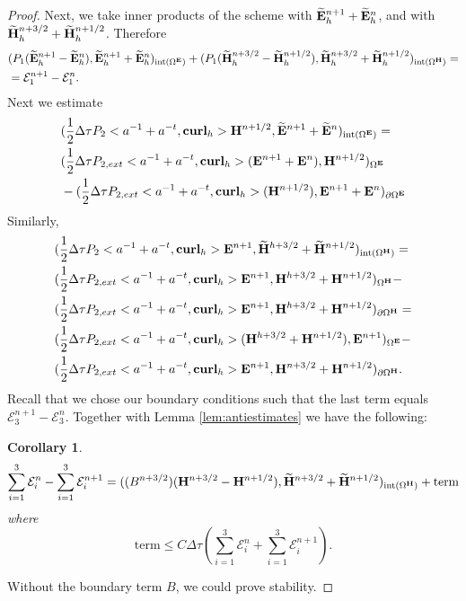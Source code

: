 \documentclass[12pt,reqno]{amsart}
\newcommand{\curl}{{\bf curl}}
\newcommand{\e}{{\bf E}}
\newcommand{\h}{{\bf H}}
\newtheorem{cor}[theorem]{Corollary}
\theoremstyle{definition}
\numberwithin{equation}{section}
\newcommand{\intr}[1]{\mathrm{int}(#1)}
\def\Gw{\Omega}     \def\Gx{\Xi}         \def\Gy{\Psi}
\begin{document}
\begin{proof}
	Next, we take inner products of the scheme with $\widetilde{\e}_h^{n+1}+\widetilde{\e}_h^n$,
	and with 
	$\widetilde{\h}_h^{n+3/2}+\widetilde{\h}_h^{n+1/2}$. Therefore
\begin{align*}
	&
	(P_1(\widetilde{\e}^{n+1}_h-\widetilde{\e}^{n}_h),\widetilde{\e}^{n+1}_h+\widetilde{\e}^{n}_h)_{\intr{\Gw^\e}}+
	(P_1(\widetilde{\h}^{n+3/2}_h-\widetilde{\h}^{n+1/2}_h),\widetilde{\h}^{n+3/2}_h+\widetilde{\h}^{n+1/2}_h)_{\intr{\Gw^\h}}=\\&
=\mathcal{E}_1^{n+1}-\mathcal{E}_1^{n}.
\end{align*}
Next we estimate
\begin{align*}
	&
		(\frac{1}{2}\Delta \tau P_2<a^{-1}+a^{-t},\curl_h>\h^{n+1/2},\widetilde{\e}^{n+1}+\widetilde{\e}^{n})_{ \intr{\Gw^\e}}=\\&
				(\frac{1}{2}\Delta \tau P_{2,ext}<a^{-1}+a^{-t},\curl_h>(\e^{n+1}+\e^{n}),\h^{n+1/2})_{ {\Gw^\e}}\\&
								-(\frac{1}{2}\Delta \tau P_{2,ext}<a^{-1}+a^{-t},\curl_h>(\h^{n+1/2}),\e^{n+1}+\e^{n})_{ {\partial{\Gw^\e}}}
\end{align*}
Similarly,
\begin{align*}
	&
	(\frac{1}{2}\Delta \tau P_2<a^{-1}+a^{-t},\curl_h>\e^{n+1},\widetilde{\h}^{h+3/2}+\widetilde{\h}^{n+1/2})_{\intr{\Gw^\h}}=\\&
		(\frac{1}{2}\Delta \tau P_{2,ext}<a^{-1}+a^{-t},\curl_h>\e^{n+1},\h^{h+3/2}+\h^{n+1/2})_{{\Gw^\h}}-
		\\&
			(\frac{1}{2}\Delta \tau P_{2,ext}<a^{-1}+a^{-t},\curl_h>\e^{n+1},\h^{h+3/2}+\h^{n+1/2})_{\partial{\Gw^\h}}=\\&
			(\frac{1}{2}\Delta \tau P_{2,ext}<a^{-1}+a^{-t},\curl_h>(\h^{h+3/2}+\h^{n+1/2}),\e^{n+1})_{{{\Gw^\e}}}
-\\&
(\frac{1}{2}\Delta \tau P_{2,ext}<a^{-1}+a^{-t},\curl_h>\e^{n+1},\h^{n+3/2}+\h^{n+1/2})_{\partial{\Gw^\h}}.
\end{align*}
Recall that we chose our boundary conditions such that 
the last term equals $\mathcal{E}_3^{n+1}-\mathcal{E}_3^{n}$.
Together with Lemma \ref{lem:antiestimates} we have the following:
\begin{cor}
$$\sum_{i=1}^3\mathcal{E}_i^n-
\sum_{i=1}^3\mathcal{E}_i^{n+1}=
((B^{n+3/2})(\h^{n+3/2}-\h^{n+1/2}),\widetilde{\h}^{n+3/2}+\widetilde{\h}^{n+1/2})_{\intr{\Gw^\h}}+\mathrm{term}
$$
where 
$$
\mathrm{term}\leq C \Delta \tau( \sum_{i=1}^3\mathcal{E}_i^n+
\sum_{i=1}^3\mathcal{E}_i^{n+1}).
$$
\end{cor}
Without the boundary term $B$, we could prove stability.


\end{proof}
\end{document}
